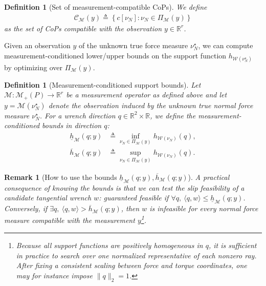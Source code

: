 \documentclass[11pt,a4paper]{article}
\theoremstyle{plain}
\newtheorem{remark}[theorem]{Remark}
\newtheorem{definition}[theorem]{Definition}
\begin{document}
\begin{definition}[Set of measurement-compatible CoPs]\label{def:CM}
    We define
    \begin{align}
    \mathcal C_{\mathcal M}(y)
    \triangleq
    \left\{
    c[\nu_N]:
    \nu_N\in\Pi_{\mathcal M}(y)
    \right\}
    \end{align}
    as the set of CoPs compatible with the observation $y \in \mathbb{R}^r$.    
\end{definition}

Given an observation $y$ of the unknown true force measure $\nu_N^\star$, we can compute measurement-conditioned lower/upper bounds on the support function $h_{\mathcal W(\nu_N^\star)}$ by optimizing over $\Pi_{\mathcal M}(y)$. 

\begin{definition}[Measurement-conditioned support bounds]\label{def:measurement_support_bounds}
Let $\mathcal M:\mathcal M_+(P)\rightarrow\mathbb R^r$ be a measurement operator as defined above and let $y=\mathcal M(\nu_N^\star)$ denote the observation induced by the unknown true normal force measure $\nu_N^\star$. For a wrench direction $q\in\mathbb R^2\times\mathbb R$, we define the \textit{measurement-conditioned bounds in direction $q$}:
\begin{align}
    \label{eq:def_mea_bounds}
    \underline h_{\mathcal M}(q;y)
    &\triangleq
    \inf_{\nu_N\in\Pi_{\mathcal M}(y)}
    h_{\mathcal W(\nu_N)}(q),\\
    \overline h_{\mathcal M}(q;y)
    &\triangleq
    \sup_{\nu_N\in\Pi_{\mathcal M}(y)}
    h_{\mathcal W(\nu_N)}(q).
\end{align}
\end{definition}


\begin{remark}[How to use the bounds $\underline h_{\mathcal M}(q;y), \overline h_{\mathcal M}(q;y)$]
    \label{rem:use_bounds}
    A practical consequence of knowing the bounds is that we can test the slip feasibility of a candidate tangential wrench $w$: guaranteed feasible if $\forall q,~\langle q,w\rangle \le \underline h_{\mathcal M}(q;y)$.
    Conversely, if $\exists q,~\langle q,w\rangle >\overline h_{\mathcal M}(q;y)$, then $w$ is infeasible for every normal force measure compatible with the measurement $y$\footnote{Because all support functions are positively homogeneous in $q$, it is sufficient in practice to search over one normalized representative of each nonzero ray. After fixing a consistent scaling between force and torque coordinates, one may for instance impose $\|q\|_2=1$.}.
\end{remark}
\end{document}
